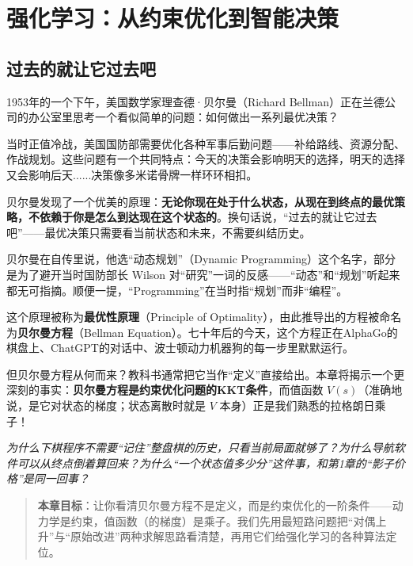 \chapter{强化学习：从约束优化到智能决策}


\section*{过去的就让它过去吧}


1953年的一个下午，美国数学家理查德·贝尔曼（Richard Bellman）正在兰德公司的办公室里思考一个看似简单的问题：如何做出一系列最优决策？

当时正值冷战，美国国防部需要优化各种军事后勤问题——补给路线、资源分配、作战规划。这些问题有一个共同特点：今天的决策会影响明天的选择，明天的选择又会影响后天......决策像多米诺骨牌一样环环相扣。

贝尔曼发现了一个优美的原理：\textbf{无论你现在处于什么状态，从现在到终点的最优策略，不依赖于你是怎么到达现在这个状态的}。换句话说，“过去的就让它过去吧”——最优决策只需要看当前状态和未来，不需要纠结历史。

贝尔曼在自传里说，他选“动态规划”（Dynamic Programming）这个名字，部分是为了避开当时国防部长 Wilson 对“研究”一词的反感——“动态”和“规划”听起来都无可指摘。顺便一提，“Programming”在当时指“规划”而非“编程”。

这个原理被称为\textbf{最优性原理}（Principle of Optimality），由此推导出的方程被命名为\textbf{贝尔曼方程}（Bellman Equation）。七十年后的今天，这个方程正在AlphaGo的棋盘上、ChatGPT的对话中、波士顿动力机器狗的每一步里默默运行。

但贝尔曼方程从何而来？教科书通常把它当作“定义”直接给出。本章将揭示一个更深刻的事实：\textbf{贝尔曼方程是约束优化问题的KKT条件}，而值函数 $V(s)$（准确地说，是它对状态的梯度；状态离散时就是 $V$ 本身）正是我们熟悉的拉格朗日乘子！

\vspace{0.3cm}
\noindent\textit{为什么下棋程序不需要“记住”整盘棋的历史，只看当前局面就够了？为什么导航软件可以从终点倒着算回来？为什么“一个状态值多少分”这件事，和第1章的“影子价格”是同一回事？}

\begin{quote}
\textbf{本章目标}：让你看清贝尔曼方程不是定义，而是约束优化的一阶条件——动力学是约束，值函数（的梯度）是乘子。我们先用最短路问题把“对偶上升”与“原始改进”两种求解思路看清楚，再用它们给强化学习的各种算法定位。
\end{quote}

